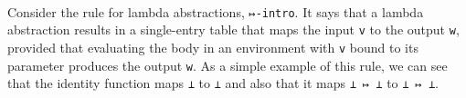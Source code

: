 \begin{fence}
\begin{code}
\AgdaSpace{}%
\AgdaSpace{}%
\AgdaSpace{}%
\AgdaSpace{}%
\AgdaSymbol{(}\AgdaSpace{}%
\AgdaSpace{}%
\AgdaSymbol{)}\<%
\\
%
\\[\AgdaEmptyExtraSkip]%
%
\>[2]\AgdaSpace{}%
\AgdaSymbol{:}\AgdaSpace{}%
\AgdaSpace{}%
\AgdaSymbol{\{}\AgdaSymbol{\}}\AgdaSpace{}%
\AgdaSymbol{\{}\AgdaSpace{}%
\AgdaSymbol{:}\AgdaSpace{}%
\AgdaSpace{}%
\AgdaSymbol{\}}\AgdaSpace{}%
\AgdaSymbol{\{}\AgdaSpace{}%
\AgdaSpace{}%
\AgdaSymbol{\}}\<%
\\
\>[2][@{}l@{\AgdaIndent{0}}]%
\>[4]\AgdaSpace{}%
\AgdaSpace{}%
\AgdaSpace{}%
\AgdaSpace{}%
\AgdaSpace{}%
\<%
\\
%
\>[4]%
\>[768I]\AgdaSpace{}%
\AgdaSpace{}%
\<%
\\
\>[.][@{}l@{}]\<[768I]%
\>[6]\AgdaComment{---------}\<%
\\
%
\>[4]\AgdaSpace{}%
\AgdaSpace{}%
\AgdaSpace{}%
\AgdaSpace{}%
\AgdaSpace{}%
\<%
\end{code}
\end{fence}

Consider the rule for lambda abstractions, \texttt{↦-intro}. It says
that a lambda abstraction results in a single-entry table that maps the
input \texttt{v} to the output \texttt{w}, provided that evaluating the
body in an environment with \texttt{v} bound to its parameter produces
the output \texttt{w}. As a simple example of this rule, we can see that
the identity function maps \texttt{⊥} to \texttt{⊥} and also that it
maps \texttt{⊥\ ↦\ ⊥} to \texttt{⊥\ ↦\ ⊥}.

\begin{fence}
\begin{code}%
\>[0]\AgdaSpace{}%
\AgdaSymbol{:}\AgdaSpace{}%
\AgdaSpace{}%
\AgdaSpace{}%
\<%
\\
\>[0]\AgdaSpace{}%
\AgdaSymbol{=}\AgdaSpace{}%
\AgdaSpace{}%
\AgdaOperator{\AgdaFunction{\#}}\AgdaSpace{}%
\<%
\end{code}
\end{fence}

